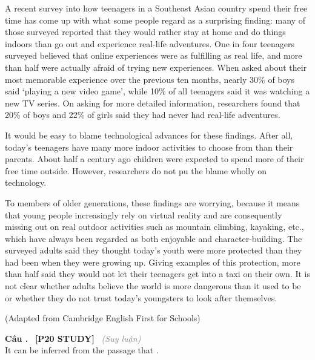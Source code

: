 \documentclass[12pt,a4paper,twoside]{article}
\newcounter{qcounter}
\newcommand{\question}[2][]{%
    \stepcounter{qcounter}%
    \par\vspace{6pt}%
    \noindent\textcolor{primaryBlue}{\textbf{Câu \theqcounter.}}~%
    \textcolor{secondaryBlue}{\small\textbf{[P20 STUDY]}}~%
    \if\relax\detokenize{#1}\relax\else\textcolor{gray}{\small\textit{(#1)}}~\fi\\[1pt]
    \noindent #2%
}
\newenvironment{readingpassage}[1][]{%
    \begin{tcolorbox}[enhanced, colback=grayLight, colframe=secondaryBlue,
        coltitle=textDark, fonttitle=\bfseries, title={#1},
        rounded corners, arc=3mm, boxrule=1pt,
        left=15pt, right=15pt, top=10pt, bottom=10pt,
        breakable, before skip=10pt, after skip=10pt, drop fuzzy shadow]
    \setstretch{1.3}
}{\end{tcolorbox}}
\begin{document}
\begin{readingpassage}[]
A recent survey into how teenagers in a Southeast Asian country spend their free time has come up with what some people regard as a surprising finding: many of those surveyed reported that they would rather stay at home and do things indoors than go out and experience real-life adventures. One in four teenagers surveyed believed that online experiences were as fulfilling as real life, and more than half were actually afraid of trying new experiences. When asked about their most memorable experience over the previous ten months, nearly 30\% of boys said ‘playing a new video game’, while 10\% of all teenagers said it was watching a new TV series. On asking for more detailed information, researchers found that 20\% of boys and 22\% of girls said they had never had real-life adventures.

It would be easy to blame technological advances for these findings. After all, today’s teenagers have many more indoor activities to choose from than their parents. About half a century ago children were expected to spend more of their free time outside. However, researchers do not pu the blame wholly on technology.

To members of older generations, these findings are worrying, because it means that young people increasingly rely on virtual reality and are consequently missing out on real outdoor activities such as mountain climbing, kayaking, etc., which have always been regarded as both enjoyable and character-building. The surveyed adults said they thought today’s youth were more protected than they had been when they were growing up. Giving examples of this protection, more than half said they would not let their teenagers get into a taxi on their own. It is not clear whether adults believe the world is more dangerous than it used to be or whether they do not trust today’s youngsters to look after themselves.

(Adapted from Cambridge English First for Schools)
\end{readingpassage}

\question[Suy luận]{It can be inferred from the passage that \underline{\hspace{1.3cm}}.}
\end{document}
